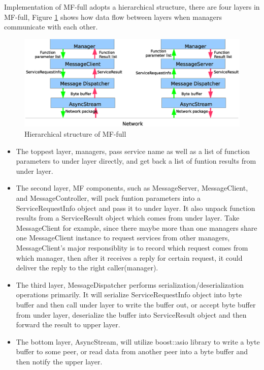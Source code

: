\documentclass[a4paper,10pt]{article}
\begin{document}
Implementation of MF-full adopts a hierarchical structure, there are four layers in MF-full, Figure \ref{fig:mf-full} shows how data flow between layers when managers communicate with each other.

\begin{figure}[!ht]\centering
  \includegraphics[width=1.0\textwidth]{mf-full.eps}
  \caption{Hierarchical structure of MF-full}\label{fig:mf-full}
\end{figure}

\begin{itemize}
\item The toppest layer, managers, pass service name as well as a list of function parameters to under layer directly, and get back a list of funtion results from under layer.
\item The second layer, MF components, such as MessageServer, MessageClient, and MessageController, will pack funtion parameters into a ServiceRequestInfo object and pass it to under layer.
It also unpack function results from a ServiceResult object which comes from under layer.
Take MessageClient for example, since there maybe more than one managers share one MessageClient instance to request services from other managers, 
MessageClient's major responsiblity is to record which request comes from which manager, then after it receives a reply for certain request, it could deliver the reply to the right caller(manager).
\item The third layer, MessageDispatcher performs serialization/deserialization operations primarily. 
It will serialize ServiceRequestInfo object into byte buffer and then call under layer to write the buffer out, or accept byte buffer from under layer, 
deserialize the buffer into ServiceResult object and then forward the result to upper layer.
\item The bottom layer, AsyncStream, will utilize boost::asio library to write a byte buffer to some peer, or read data from another peer into a byte buffer and then notify the upper layer.
\end{itemize}
\end{document}
